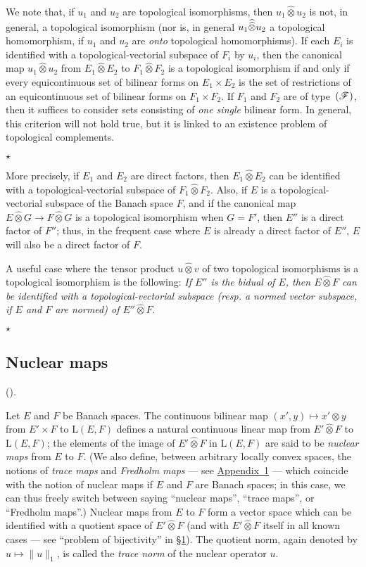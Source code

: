 \documentclass{article}
\theoremstyle{plain}
\newcommand{\aster}[1]{$\star${#1}$\star$}
\newcommand{\LL}{\mathrm{L}}
\newcommand{\FF}{\mbox{\normalfont($\mathscr{F}$)}}
\newcommand{\hotimes}{\widehat{\otimes}}
\newcommand{\hhotimes}{\skew{0}{\widehat}{\skew{0}\widehat{\otimes}}}
\newcommand{\oldpage}[1]{\marginpar{\footnotesize$\Big\vert$ \textit{p.~#1}}}
\begin{document}
We note that, if $u_1$ and $u_2$ are topological isomorphisms, then $u_1\hotimes u_2$ is not, in general, a topological isomorphism (nor is, in general $u_1\hhotimes u_2$ a topological homomorphism, if $u_1$ and $u_2$ are \emph{onto} topological homomorphisms).
If each $E_i$ is identified with a topological-vectorial subspace of $F_i$ by $u_i$, then the canonical map $u_1\hotimes u_2$ from $E_1\hotimes E_2$ to $F_1\hotimes F_2$ is a topological isomorphism if and only if every equicontinuous set of bilinear forms on $E_1\times E_2$ is the set of restrictions of an equicontinuous set of bilinear forms on $F_1\times F_2$.
If $F_1$
\oldpage{85}
and $F_2$ are of type~$\FF$, then it suffices to consider sets consisting of \emph{one single} bilinear form.
In general, this criterion will not hold true, but it is linked to an existence problem of topological complements.

\aster{%
  More precisely, if $E_1$ and $E_2$ are direct factors, then $E_1\hotimes E_2$ can be identified with a topological-vectorial subspace of $F_1\hotimes F_2$.
  Also, if $E$ is a topological-vectorial subspace of the Banach space $F$, and if the canonical map $E\hotimes G\to F\hotimes G$ is a topological isomorphism when $G=F'$, then $E''$ is a direct factor of $F''$;
  thus, in the frequent case where $E$ is already a direct factor of $E''$, $E$ will also be a direct factor of $F$.

  A useful case where the tensor product $u\hotimes v$ of two topological isomorphisms is a topological isomorphism is the following:
  \emph{If $E''$ is the bidual of $E$, then $E\hotimes F$ can be identified with a topological-vectorial subspace (resp. a normed vector subspace, if $E$ and $F$ are normed) of $E''\hotimes F$}.
}


\subsection{Nuclear maps}
\label{1.7}

(\cite[chap.~1, \S3, n\textsuperscript{o}~2]{PTT}).
\medskip

Let $E$ and $F$ be Banach spaces.
The continuous bilinear map $(x',y)\mapsto x'\otimes y$ from $E'\times F$ to $\LL(E,F)$ defines a natural continuous linear map from $E'\hotimes F$ to $\LL(E,F)$;
the elements of the image of $E'\hotimes F$ in $\LL(E,F)$ are said to be \emph{nuclear maps} from $E$ to $F$.
(We also define, between arbitrary locally convex spaces, the notions of \emph{trace maps} and \emph{Fredholm maps} --- see \hyperref[appendix1]{Appendix~1} --- which coincide with the notion of nuclear maps if $E$ and $F$ are Banach spaces; in this case, we can thus freely switch between saying ``nuclear maps'', ``trace maps'', or ``Fredholm maps''.)
Nuclear maps from $E$ to $F$ form a vector space which can be identified with a quotient space of $E'\hotimes F$ (and with $E'\hotimes F$ itself in all known cases --- see ``problem of bijectivity'' in \hyperref[1]{\S1}).
The quotient norm, again denoted by $u\mapsto\|u\|_1$, is called the \emph{trace norm} of the nuclear operator $u$.
\end{document}
